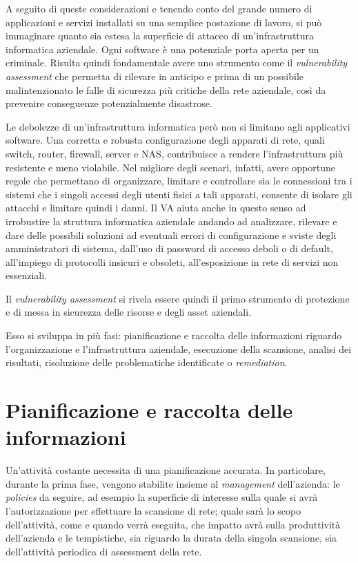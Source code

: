 \documentclass[target=bach,aauheader=]{thud}
\begin{document}
A seguito di queste considerazioni e tenendo conto del grande numero di applicazioni e servizi installati su una semplice postazione di lavoro, si può immaginare quanto sia estesa la superficie di attacco di un’infrastruttura informatica aziendale. Ogni software è una potenziale porta aperta per un criminale. Risulta quindi fondamentale avere uno strumento come il \textit{vulnerability assessment} che permetta di rilevare in anticipo e prima di un possibile malintenzionato le falle di sicurezza più critiche della rete aziendale, così da prevenire conseguenze potenzialmente disastrose.

Le debolezze di un’infrastruttura informatica però non si limitano agli applicativi software. Una corretta e robusta configurazione degli apparati di rete, quali switch, router, firewall, server e NAS, contribuisce a rendere l’infrastruttura più resistente e meno violabile. Nel migliore degli scenari, infatti, avere opportune regole che permettano di organizzare, limitare e controllare sia le connessioni tra i sistemi che i singoli accessi degli utenti fisici a tali apparati, consente di isolare gli attacchi e limitare quindi i danni. Il VA aiuta anche in questo senso ad irrobustire la struttura informatica aziendale andando ad analizzare, rilevare e dare delle possibili soluzioni ad eventuali errori di configurazione e sviste degli amministratori di sistema, dall’uso di password di accesso deboli o di default, all’impiego di protocolli insicuri e obsoleti, all’esposizione in rete di servizi non essenziali.

Il \textit{vulnerability assessment} si rivela essere quindi il primo strumento di protezione e di messa in sicurezza delle risorse e degli asset aziendali.

Esso si sviluppa in più fasi: pianificazione e raccolta delle informazioni riguardo l’organizzazione e l’infrastruttura aziendale, esecuzione della scansione, analisi dei risultati, risoluzione delle problematiche identificate o \textit{remediation}.


\section{Pianificazione e raccolta delle informazioni}
Un’attività costante necessita di una pianificazione accurata. In particolare, durante la prima fase, vengono stabilite insieme al \textit{management} dell’azienda: le \textit{policies} da seguire, ad esempio la superficie di interesse sulla quale si avrà l’autorizzazione per effettuare la scansione di rete; quale sarà lo scopo dell’attività, come e quando verrà eseguita, che impatto avrà sulla produttività dell’azienda e le tempistiche, sia riguardo la durata della singola scansione, sia dell’attività periodica di assessment della rete.
\end{document}
